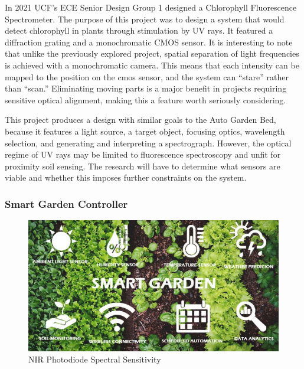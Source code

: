 In 2021 UCF’s ECE Senior Design Group 1 designed a Chlorophyll Fluorescence Spectrometer. The purpose of this project was to design a system that would detect chlorophyll in plants through stimulation by UV rays. It featured a diffraction grating and a monochromatic CMOS sensor. It is interesting to note that unlike the previously explored project, spatial separation of light frequencies is achieved with a monochromatic camera. This means that each intensity can be mapped to the position on the cmos sensor, and the system can “stare” rather than “scan.” Eliminating moving parts is a major benefit in projects requiring sensitive optical alignment, making this a feature worth seriously considering.

This project produces a design with similar goals to the Auto Garden Bed, because it features a light source, a target object, focusing optics, wavelength selection, and generating and interpreting a spectrograph. However, the optical regime of UV rays may be limited to fluorescence spectroscopy and unfit for proximity soil sensing. The research will have to determine what sensors are viable and whether this imposes further constraints on the system.

\subsubsection{Smart Garden Controller}

\begin{figure}[H]
    \caption{NIR Photodiode Spectral Sensitivity}
    \centering
    \includegraphics[width=\textwidth]{images/3.1.3Pic.png}
\end{figure}

